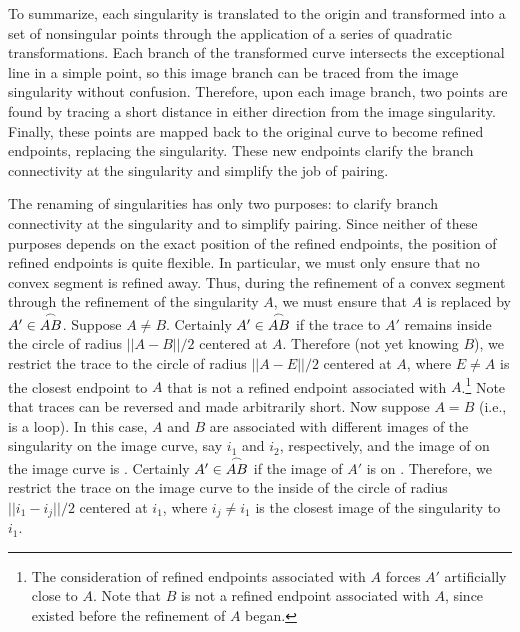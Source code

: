 
To summarize, each singularity is translated to the origin and transformed 
into a set of nonsingular points through the application of a series of quadratic 
transformations.  Each branch of the transformed curve intersects the 
exceptional line in a simple point, so this image branch can be traced
from the image singularity without confusion.
Therefore, upon each image branch, two points are found by tracing a 
short distance in either direction from the image singularity.
Finally, these points are mapped back to the original curve
to become refined endpoints, replacing the singularity.
These new endpoints clarify the branch connectivity at the singularity
and simplify the job of pairing.


The renaming of singularities has only two purposes: to clarify branch
connectivity at the singularity and to simplify pairing.
Since neither of these purposes depends on the exact position of the refined endpoints,
the position of refined endpoints is quite flexible.
\label{page-flex}
In particular, we must only ensure that no convex segment is refined away.
Thus, during the refinement of a convex segment  through the refinement
of the singularity $A$, we must ensure that $A$ is replaced by 
$A' \in \mbox{$\stackrel{\frown}{AB}$}$.
Suppose $A \neq B$.
Certainly $A' \in \mbox{$\stackrel{\frown}{AB}$}$ if the trace to $A'$ remains inside
the circle of radius $||A - B||/2$ centered at $A$.
Therefore (not yet knowing $B$), we restrict the trace to the circle
of radius $||A - E||/2$ centered at $A$, where $E \neq A$ is the closest endpoint
to $A$ that is not a refined endpoint associated with $A$.\footnote{The consideration of 
	refined endpoints
	associated with $A$ forces $A'$ artificially close to $A$.
	Note that $B$ is not 
	a refined endpoint associated with $A$, since  
	existed before the refinement of $A$ began.}
Note that traces can be reversed and made arbitrarily short.
Now suppose $A = B$ (i.e.,  is a loop).
In this case, $A$ and $B$ are associated with different images 
of the singularity on the image curve, say $i_{1}$ and $i_{2}$, respectively, and 
the image of  on the image curve is .
Certainly $A' \in \mbox{$\stackrel{\frown}{AB}$}$ if the image of $A'$ is on .
Therefore, we restrict the trace on the image curve to the
inside of the circle of radius
$||i_{1} - i_{j}||/2$ centered at $i_{1}$, 
where $i_{j} \neq i_{1}$ is the closest image of the singularity to $i_{1}$.

